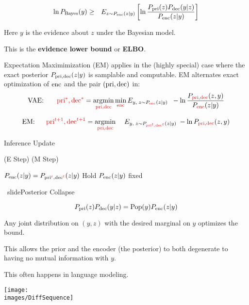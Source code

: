 {
{\huge
\begin{eqnarray*}
\ln P_{\mathrm{Bayes}}(y) & \geq & E_{z \sim P_{\mathrm{enc}}(z|y)}\left[\ln \frac{P_{\mathrm{pri}}(z)P_{\mathrm{dec}}(y|z)}{P_{\mathrm{enc}}(z|y)}\right] \\
\end{eqnarray*}
}

Here $y$ is the evidence about $z$ under the Bayesian model.

\vfill
This is the {\bf evidence lower bound} or {\bf ELBO}.


Expectation Maximimization (EM) applies in the (highly special) case where the exact posterior $P_{\mathrm{pri},\mathrm{dec}}(z|y)$ is samplable and computable.
EM alternates exact optimization of $\mathrm{enc}$ and the pair $(\mathrm{pri},\mathrm{dec})$ in:
$$\mbox{VAE:}\;\;\;\;\;\;\; {\color{red} \mathrm{pri}^*,\mathrm{dec}^*} = \operatorname*{argmin}_{\color{red} \mathrm{pri},\mathrm{dec}} \min_{\color{red} \mathrm{enc}} E_{y,\;z \sim P_{\color{red} \mathrm{enc}}(z|y)}\;\;- \ln \frac{P_{\color{red} \mathrm{pri},\mathrm{dec}}(z,y)}{P_{\color{red} \mathrm{enc}}(z|y)}$$

\vfill
$$\mbox{EM:}\;\;\;\;\;\; {\color{red} \mathrm{pri}^{t+1},\mathrm{dec}^{t+1}} =  \operatorname*{argmin}_{\color{red} \mathrm{pri},\mathrm{dec}}\;\;\;\;E_{y,\;z \sim P_{\color{red} \mathrm{pri}^t,\mathrm{dec}^t}(z|y)}\; - \ln P_{\color{red} \mathrm{pri},\mathrm{dec}}(z,y)$$

\vfill
\centerline{\hspace{1em} Inference \hspace{6em} Update \hspace{2.5em}~}
\centerline{(E Step) \hspace{6em} (M Step) ~}
\centerline{ $P_{\mathrm{enc}}(z|y) = P_{\mathrm{pri}^{\color{red} t},\mathrm{dec}^{\color{red} t}}(z|y)$ \hspace{2.5em} Hold $P_{\mathrm{enc}}(z|y)$ fixed \hspace{0em}~}
\
slide{Posterior Collapse}


{\color{red} $$P_{\mathrm{pri}}(z)P_{\mathrm{dec}}(y|z) = \mathrm{Pop}(y)P_{\mathrm{enc}}(z|y)$$}

\vfill
Any joint distribution on $(y,z)$ with the desired marginal on $y$ optimizes the bound.

\vfill
This allows the prior and the encoder (the posterior) to both degenerate to having no mutual information with $y$.

\vfill
This often happens in language modeling.



\centerline{\texttt{[image: \\images/DiffSequence]}}

}
